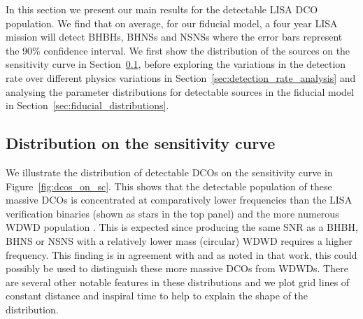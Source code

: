 
In this section we present our main results for the detectable LISA DCO population. We find that on average, for our fiducial model, a four year LISA mission will detect  BHBHs,  BHNSs and  NSNSs where the error bars represent the 90\% confidence interval. We first show the distribution of the sources on the sensitivity curve in Section~\ref{sec:dcos_on_sc}, before exploring the variations in the detection rate over different physics variations in Section~\ref{sec:detection_rate_analysis} and analysing the parameter distributions for detectable sources in the fiducial model in Section~\ref{sec:fiducial_distributions}.

\subsection{Distribution on the sensitivity curve}\label{sec:dcos_on_sc}

We illustrate the distribution of detectable DCOs on the sensitivity curve in Figure~\ref{fig:dcos_on_sc}. This shows that the detectable population of these massive DCOs is concentrated at comparatively lower frequencies than the LISA verification binaries (shown as stars in the top panel) and the more numerous WDWD population \citep[e.g.][]{Korol+2017}. This is expected since producing the same SNR as a BHBH, BHNS or NSNS with a relatively lower mass (circular) WDWD requires a higher frequency. This finding is in agreement with \citet{Sesana+2020} and as noted in that work, this could possibly be used to distinguish these more massive DCOs from WDWDs. There are several other notable features in these distributions and we plot grid lines of constant distance and inspiral time to help to explain the shape of the distribution.

